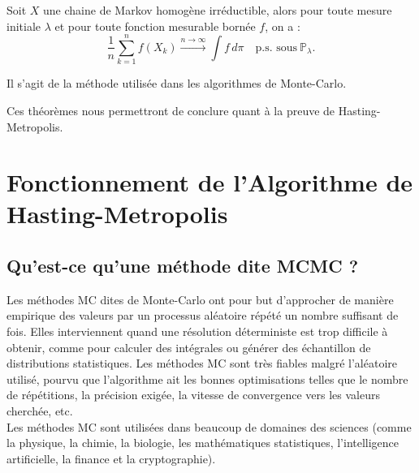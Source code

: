 \documentclass{article}
\begin{document}
\begin{tcolorbox}[colback=white,colframe=blue!80!black,title=Convergence des méthodes de Monte-Carlo]
Soit $X$ une chaine de Markov homogène irréductible, alors pour toute mesure initiale $\lambda$ et pour toute fonction mesurable bornée $f$, on a :
\[
\frac{1}{n} \sum_{k=1}^{n} f(X_k) \xrightarrow{n \to \infty} \int f \, d\pi \quad \text{p.s. sous} \ \mathbb{P}_\lambda.
\]

Il s'agit de la méthode utilisée dans les algorithmes de Monte-Carlo.
\end{tcolorbox}
  
Ces théorèmes nous permettront de conclure quant à la preuve de Hasting-Metropolis.

\newpage
\section{Fonctionnement de l'Algorithme de Hasting-Metropolis}

\subsection{Qu'est-ce qu'une méthode dite MCMC ?}

Les méthodes MC dites de Monte-Carlo ont pour but d'approcher de manière empirique des valeurs par un processus aléatoire répété un nombre suffisant de fois. Elles interviennent quand une résolution déterministe est trop difficile à obtenir, comme pour calculer des intégrales ou générer des échantillon de distributions statistiques. Les méthodes MC sont très fiables malgré l'aléatoire utilisé, pourvu que l'algorithme ait les bonnes optimisations telles que le nombre de répétitions, la précision exigée, la vitesse de convergence vers les valeurs cherchée, etc. \\
Les méthodes MC sont utilisées dans beaucoup de domaines des sciences (comme la physique, la chimie, la biologie, les mathématiques statistiques, l'intelligence artificielle, la finance et la cryptographie). \\
\end{document}
